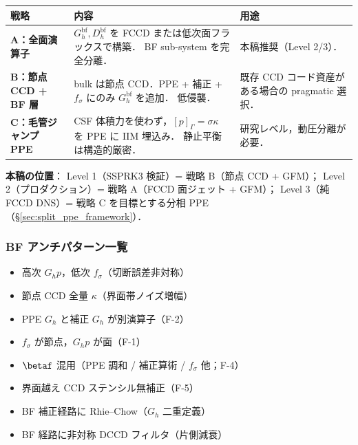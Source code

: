 \begin{center}
\begin{tabular}{@{}p{}p{}p{}@{}}
\hline
戦略 & 内容 & 用途 \\
\hline
\textbf{A：全面演算子} &
$G_h^\text{bf},D_h^\text{bf}$ を FCCD または低次面フラックスで構築．
BF sub-system を完全分離．
& 本稿推奨（Level 2/3）．
\\
\textbf{B：節点 CCD + BF 層} &
bulk は節点 CCD．PPE + 補正 + $f_\sigma$ にのみ $G_h^\text{bf}$ を追加．
低侵襲．
& 既存 CCD コード資産がある場合の pragmatic 選択．
\\
\textbf{C：毛管ジャンプ PPE} &
CSF 体積力を使わず，$[p]_\Gamma=\sigma\kappa$ を PPE に IIM 埋込み．
静止平衡は構造的厳密．
& 研究レベル，動圧分離が必要．
\\
\hline
\end{tabular}
\end{center}

\noindent\textbf{本稿の位置}：
Level 1（SSPRK3 検証）= 戦略 B（節点 CCD + GFM）；
Level 2（プロダクション）= 戦略 A（FCCD 面ジェット + GFM）；
Level 3（純 FCCD DNS）= 戦略 C を目標とする分相 PPE
（\S\ref{sec:split_ppe_framework}）．

\subsubsection{BF アンチパターン一覧}
\label{sec:fccd_bf_anti_patterns}

\begin{tcolorbox}[warnbox,title={避けるべき BF アンチパターン}]
\begin{itemize}[leftmargin=1.5em,noitemsep]
  \item 高次 $G_h p$，低次 $f_\sigma$（切断誤差非対称）
  \item 節点 CCD 全量 $\kappa$（界面帯ノイズ増幅）
  \item PPE $G_h$ と補正 $G_h$ が別演算子（F-2）
  \item $f_\sigma$ が節点，$G_h p$ が面（F-1）
  \item $\betaf$ 混用（PPE 調和 / 補正算術 / $f_\sigma$ 他；F-4）
  \item 界面越え CCD ステンシル無補正（F-5）
  \item BF 補正経路に Rhie--Chow（$G_h$ 二重定義）
  \item BF 経路に非対称 DCCD フィルタ（片側減衰）
\end{itemize}
\end{tcolorbox}

